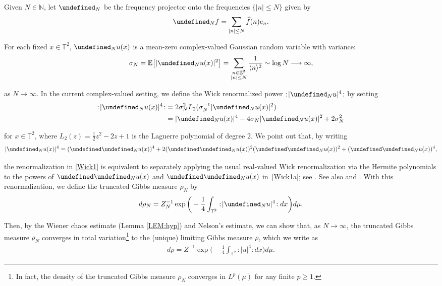 \documentclass[%
11pt,  reqno]{amsart}
\newcommand{\1}{\hspace{0.2mm}\text{I}\hspace{0.2mm}}
\newcommand{\noi}{\noindent}
\newcommand{\Z}{\mathbb{Z}}
\newcommand{\T}{\mathbb{T}}
\let\Re=\undefined\DeclareMathOperator*{\Re}{Re}
\let\Im=\undefined\DeclareMathOperator*{\Im}{Im}
\let\P= \undefined
\newcommand{\P}{\mathbf{P}}
\newcommand{\E}{\mathbb{E}}
\newcommand{\s}{\sigma}
\newcommand{\ft}{\widehat}
\newcommand{\jb}[1]
{\langle #1 \rangle}
\newcommand{\too}{\longrightarrow}
\newcommand{\N}{\mathbb{N}}
\numberwithin{equation}{section}
\numberwithin{theorem}{section}
\begin{document}
 Given $N \in \N$,  let $\P_N$ be  the frequency projector
 onto the frequencies $\{|n|\le N\}$ given by 
\begin{align*}
\P_N f = 
\sum_{ |n| \leq N}  \ft f (n)  e_n.
\end{align*}


\noi
For each fixed $x \in \T^2$, 
$ \P_N u(x)$ is
a mean-zero complex-valued Gaussian random variable with variance:
\begin{align}
\s_N = \E\big[|\P_N u(x)|^2\big] = \sum _{\substack{n \in \Z^2\\|n| \le N}} \frac1{\jb{n}^2}
\sim  \log N \too \infty, 
\label{sigma1}
\end{align}


\noi
as $N\to\infty$. 
In the current complex-valued setting, 
we define the Wick renormalized  power
$:\! |\P_N u|^4\!:$
by setting
\begin{align}
\begin{split}
:\! |\P_N u(x)|^4 \!: 
& = 2 \s_N^2 L_2(\s_N^{-1}|\P_N u(x)|^2)\\
& = |\P_N u(x)|^4 - 4 \s_N |\P_N u(x)|^2 + 2\s_N^2
\end{split}
\label{Wick1}
\end{align}

\noi
for $x \in \T^2$, 
where $L_2(z) = \frac 12 z^2 - 2z + 1$ is the Laguerre polynomial of degree $2$.
We point out that, by writing 
\begin{align}
|\P_N u(x) |^4 = (\Re \P_N u(x))^4 
+ 2 (\Re \P_N u(x))^2  (\Im \P_N u(x))^2
 + (\Im \P_N u(x))^4, 
\label{Wick1a} 
\end{align}

\noi
the renormalization in \eqref{Wick1}
is equivalent to separately applying the usual real-valued Wick renormalization via the Hermite polynomials to 
the powers of 
$\Re \P_N u(x)$ and $\Im\P_N u(x)$ in~\eqref{Wick1a};
see \cite[Lemma~2.1]{OTh1}.
See also \cite[p.\,2966]{BO}
and \cite[p.\,107]{OS}.
With this renormalization, we define the truncated Gibbs measure $\rho_N$ by 
\begin{align}
d\rho_N = Z_N^{-1} \exp\bigg(- \frac 14 \int_{\T^2} :\! |\P_N u|^4\!:  dx\bigg) d\mu.
\label{Gibbs4}
\end{align} 


\noi
Then, by 
the Wiener chaos estimate (Lemma \ref{LEM:hyp})
and Nelson's estimate, we can show that, as $N \to \infty$, 
the truncated Gibbs measure $\rho_N$ converges in total variation\footnote{In fact, 
the  density of the truncated Gibbs measure $\rho_N$ converges in $L^p(\mu)$ for any finite $p \ge 1$.} to 
the (unique) limiting Gibbs measure $\rho$, 
which we write as 
\begin{align}
d\rho = Z^{-1} \exp\bigg(- \frac 14 \int_{\T^2} :\! | u|^4\!:  dx\bigg) d\mu.
\label{Gibbs5}
\end{align} 
\end{document}
